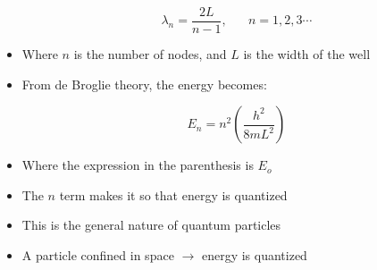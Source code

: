 \begin{itemize}
    $$\lambda_n=\frac{2L}{n-1},\,\,\,\,\,\,\,\,\,\,n=1,2,3\cdots$$

  \item Where $n$ is the number of nodes, and $L$ is the width of the well

  \item From de Broglie theory, the energy becomes:

    $$E_n=n^2\left( \frac{h^2}{8mL^2} \right)$$

  \item Where the expression in the parenthesis is $E_o$

  \item The $n$ term makes it so that energy is quantized

  \item This is the general nature of quantum particles

  \item A particle confined in space $\to$ energy is quantized

\end{itemize}




